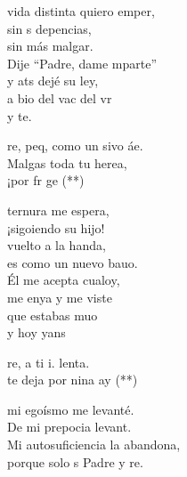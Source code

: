 \begin{cancion}%
	 vida distinta quiero emper,\\
	sin s depencias,\\
	sin más malgar.\\
	Dije “Padre, dame mparte” \\
	y ats dejé su ley,\\
	a bio del vac del vr \\
	y  te.\jump\\
	\begin{chorus}%
		re, peq, como un sivo áe.\\
		Malgas toda tu herea,\\
		¡por fr ge (**)\jump\\
	\end{chorus}%
	 ternura me espera, \\
	¡sigoiendo su hijo!\\
	vuelto a la handa,\\
	es como un nuevo bauo.\\
	Él me acepta cualoy,\\
	me enya y me viste\\
	que estabas muo \\
	y hoy yans \jump\\
	\begin{chorus}%
		re, a ti i.  lenta\chord{si}{m}{ré}.\\
		te deja por nina ay (**)\jump\\
	\end{chorus}%
	mi egoísmo me levanté.\\
	De mi prepocia levant.\\
	Mi autosuficiencia la abandona, \\
	porque solo s Padre y re.\\
\end{cancion}%
